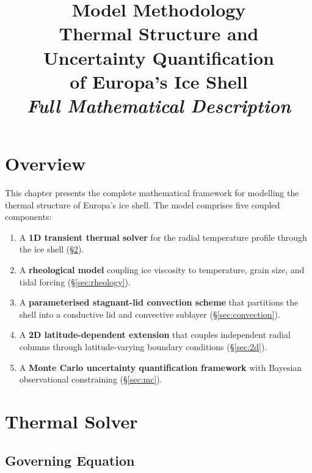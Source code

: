 \documentclass[11pt,a4paper]{article}
\title{\textbf{Model Methodology}\\[0.3em]
\Large Thermal Structure and Uncertainty Quantification\\
of Europa's Ice Shell\\[0.5em]
\large\textit{Full Mathematical Description}}
\author{}
\date{}
\begin{document}
\maketitle
\thispagestyle{fancy}

\tableofcontents
\newpage

\section{Overview}

This chapter presents the complete mathematical framework for modelling
the thermal structure of Europa's ice shell. The model comprises five
coupled components:

\begin{enumerate}[leftmargin=2em]
\item A \textbf{1D transient thermal solver} for the radial temperature
      profile through the ice shell (\S\ref{sec:thermal}).
\item A \textbf{rheological model} coupling ice viscosity to temperature,
      grain size, and tidal forcing (\S\ref{sec:rheology}).
\item A \textbf{parameterised stagnant-lid convection scheme} that
      partitions the shell into a conductive lid and convective sublayer
      (\S\ref{sec:convection}).
\item A \textbf{2D latitude-dependent extension} that couples independent
      radial columns through latitude-varying boundary conditions
      (\S\ref{sec:2d}).
\item A \textbf{Monte Carlo uncertainty quantification framework} with
      Bayesian observational constraining (\S\ref{sec:mc}).
\end{enumerate}

\section{Thermal Solver}
\label{sec:thermal}

\subsection{Governing Equation}
\end{document}
